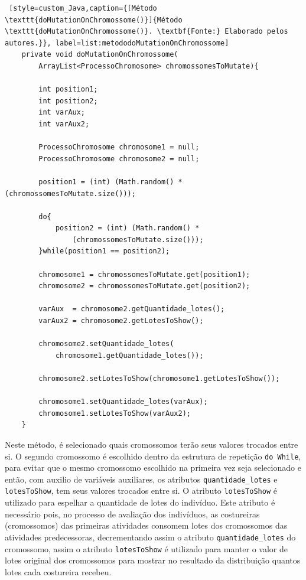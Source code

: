 \begin{lstlisting} [style=custom_Java,caption={[Método \texttt{doMutationOnChromossome()}]{Método \texttt{doMutationOnChromossome()}. \textbf{Fonte:} Elaborado pelos autores.}}, label=list:metododoMutationOnChromossome] 
	private void doMutationOnChromossome(
		ArrayList<ProcessoChromosome> chromossomesToMutate){
	
		int position1;
		int position2;
		int varAux;
		int varAux2;
		
		ProcessoChromosome chromosome1 = null;
		ProcessoChromosome chromosome2 = null;
		
		position1 = (int) (Math.random() * (chromossomesToMutate.size()));
		
		do{
			position2 = (int) (Math.random() * 
				(chromossomesToMutate.size()));
		}while(position1 == position2);
	
		chromosome1 = chromossomesToMutate.get(position1);
		chromosome2 = chromossomesToMutate.get(position2);
		
		varAux  = chromosome2.getQuantidade_lotes();
		varAux2 = chromosome2.getLotesToShow();
		
		chromosome2.setQuantidade_lotes(
			chromosome1.getQuantidade_lotes());
			
		chromosome2.setLotesToShow(chromosome1.getLotesToShow());
		
		chromosome1.setQuantidade_lotes(varAux);
		chromosome1.setLotesToShow(varAux2);
	}

\end{lstlisting}

\par Neste método, é selecionado quais cromossomos terão seus valores trocados entre si. O segundo cromossomo é escolhido dentro da 
estrutura de repetição \texttt{do While}, para evitar que o mesmo cromossomo escolhido na primeira vez seja selecionado e então, com auxilio de variáveis auxiliares, os atributos \texttt{quantidade\_lotes} e \texttt{lotesToShow}, tem seus valores trocados entre si. O atributo \texttt{lotesToShow} é utilizado para espelhar a quantidade de lotes do indivíduo. Este atributo é necessário pois, no processo de avaliação dos indivíduos, as costureiras (cromossomos) das primeiras atividades consomem lotes dos cromossomos das atividades predecessoras, decrementando assim o atributo \texttt{quantidade\_lotes} do cromossomo, assim o atributo \texttt{lotesToShow} é utilizado para manter o valor de lotes original dos cromossomos para mostrar no resultado da distribuição quantos lotes cada costureira recebeu.


